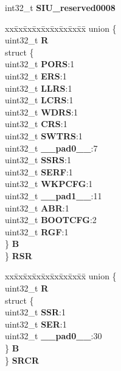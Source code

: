 \begin{DoxyCompactItemize}
\begin{tabbing}
\end{tabbing}\item 
\mbox{\label{structSIU__tag_a6c1638daba03781b944dcae8510c08dd}} 
int32\+\_\+t {\bfseries S\+I\+U\+\_\+reserved0008}
\item 
\mbox{\label{structSIU__tag_ad8454baa5c25ecdc93bb180c12fdfb3b}} 
\begin{tabbing}
xx\=xx\=xx\=xx\=xx\=xx\=xx\=xx\=xx\=\kill
union \{\\
\>uint32\_t {\bfseries R}\\
\>struct \{\\
\>\>uint32\_t {\bfseries PORS}:1\\
\>\>uint32\_t {\bfseries ERS}:1\\
\>\>uint32\_t {\bfseries LLRS}:1\\
\>\>uint32\_t {\bfseries LCRS}:1\\
\>\>uint32\_t {\bfseries WDRS}:1\\
\>\>uint32\_t {\bfseries CRS}:1\\
\>\>uint32\_t {\bfseries SWTRS}:1\\
\>\>uint32\_t {\bfseries \_\_pad0\_\_}:7\\
\>\>uint32\_t {\bfseries SSRS}:1\\
\>\>uint32\_t {\bfseries SERF}:1\\
\>\>uint32\_t {\bfseries WKPCFG}:1\\
\>\>uint32\_t {\bfseries \_\_pad1\_\_}:11\\
\>\>uint32\_t {\bfseries ABR}:1\\
\>\>uint32\_t {\bfseries BOOTCFG}:2\\
\>\>uint32\_t {\bfseries RGF}:1\\
\>\} {\bfseries B}\\
\} {\bfseries RSR}\\

\end{tabbing}\item 
\mbox{\label{structSIU__tag_a5b53b6d5f861342896572019b782f133}} 
\begin{tabbing}
xx\=xx\=xx\=xx\=xx\=xx\=xx\=xx\=xx\=\kill
union \{\\
\>uint32\_t {\bfseries R}\\
\>struct \{\\
\>\>uint32\_t {\bfseries SSR}:1\\
\>\>uint32\_t {\bfseries SER}:1\\
\>\>uint32\_t {\bfseries \_\_pad0\_\_}:30\\
\>\} {\bfseries B}\\
\} {\bfseries SRCR}\\


\end{tabbing}
\end{DoxyCompactItemize}
